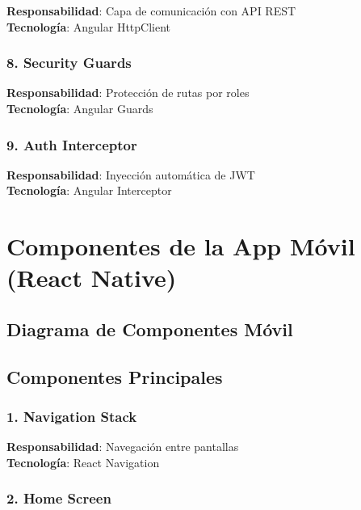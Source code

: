 \documentclass[
  spanish,
  11pt,
  letterpaper,
]{book}
\begin{document}
\textbf{Responsabilidad}: Capa de comunicación con API REST\\
\textbf{Tecnología}: Angular HttpClient

\subsubsection{8. Security Guards}\label{security-guards}

\textbf{Responsabilidad}: Protección de rutas por roles\\
\textbf{Tecnología}: Angular Guards

\subsubsection{9. Auth Interceptor}\label{auth-interceptor}

\textbf{Responsabilidad}: Inyección automática de JWT\\
\textbf{Tecnología}: Angular Interceptor

\section{Componentes de la App Móvil (React
Native)}\label{componentes-de-la-app-muxf3vil-react-native}

\subsection{Diagrama de Componentes
Móvil}\label{diagrama-de-componentes-muxf3vil}

\subsection{Componentes Principales}\label{componentes-principales-1}

\subsubsection{1. Navigation Stack}\label{navigation-stack}

\textbf{Responsabilidad}: Navegación entre pantallas\\
\textbf{Tecnología}: React Navigation

\subsubsection{2. Home Screen}\label{home-screen}
\end{document}
